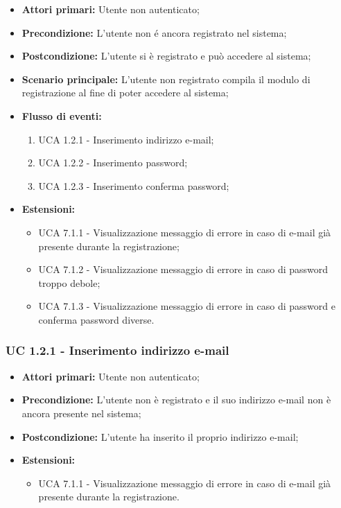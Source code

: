 \begin{itemize}
\item \textbf{Attori primari:} Utente non autenticato;
\item \textbf{Precondizione:} L'utente non é ancora registrato nel sistema;
\item \textbf{Postcondizione:} L'utente si è registrato e può accedere al sistema;
\item \textbf{Scenario principale:} L'utente non registrato compila il modulo di registrazione al fine di poter accedere al sistema;%
\item \textbf{Flusso di eventi:} %
  \begin{enumerate}
        \item UCA 1.2.1 - Inserimento indirizzo e-mail;
        \item UCA 1.2.2 - Inserimento password;
        \item UCA 1.2.3 - Inserimento conferma password;
    \end{enumerate}
\item \textbf{Estensioni:}
	\begin{itemize}
		\item UCA 7.1.1 - Visualizzazione messaggio di errore in caso di e-mail già presente durante la registrazione;
		\item UCA 7.1.2 - Visualizzazione messaggio di errore in caso di password troppo debole;
		\item UCA 7.1.3 - Visualizzazione messaggio di errore in caso di password e conferma password diverse. 
	\end{itemize}
\end{itemize}

\subsubsection{UC 1.2.1 - Inserimento indirizzo e-mail}%

\begin{itemize}
\item \textbf{Attori primari:} Utente non autenticato;
\item \textbf{Precondizione:} L'utente non è registrato e il suo indirizzo e-mail non è ancora presente nel sistema;
\item \textbf{Postcondizione:} L'utente ha inserito il proprio indirizzo e-mail;
\item \textbf{Estensioni:}
	\begin{itemize}
		\item UCA 7.1.1 - Visualizzazione messaggio di errore in caso di e-mail già presente durante la registrazione.
	\end{itemize}
\end{itemize}

